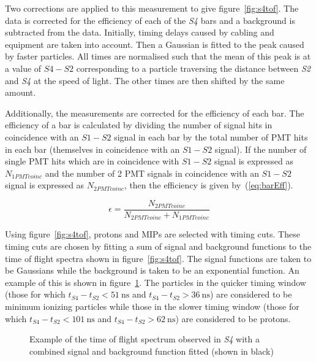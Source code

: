 Two corrections are applied to this measurement to give figure~\ref{fig:s4tof}. 
The data is corrected for the efficiency of each of the \textit{S4} bars and a background is subtracted from the data. %
Initially, timing delays caused by cabling and equipment are taken into account. %
Then a Gaussian is fitted to the peak caused by faster particles.
All times are normalised such that the mean of this peak is at a value of $\mathit{S4} - \mathit{S2}$ corresponding to a particle traversing the distance between \textit{S2} and \textit{S4} at the speed of light. 
The other times are then shifted by the same amount.

Additionally, the measurements are corrected for the efficiency of each bar. 
The efficiency of a bar is calculated by dividing the number of signal hits in coincidence with an $\mathit{S1}-\mathit{S2}$ signal in each bar by the total number of PMT hits in each bar (themselves in coincidence with an $\mathit{S1}-\mathit{S2}$ signal). 
If the number of single PMT hits which are in coincidence with $\mathit{S1}-\mathit{S2}$ signal is expressed as $N_{1PMTcoinc}$ and the number of 2 PMT signals in coincidence with an $\mathit{S1}-\mathit{S2}$ signal is expressed as $N_{2PMTcoinc}$, then the efficiency is given by~(\ref{eq:barEff}).

\begin{equation}
  \epsilon = \frac{N_{2PMTcoinc}}{N_{2PMTcoinc}+N_{1PMTcoinc}}
  \label{eq:barEff}
\end{equation}

Using figure~\ref{fig:s4tof}, protons and MIPs are selected with timing cuts. 
These timing cuts are chosen by fitting a sum of signal and background functions to the time of flight spectra shown in figure~\ref{fig:s4tof}. 
The signal functions are taken to be Gaussians while the background is taken to be an exponential function. 
An example of this is shown in figure~\ref{fig:fitEx}.
The particles in the quicker timing window (those for which $t_{\mathit{S4}}-t_{\mathit{S2}}<51~\text{ns}$ and $t_{\mathit{S4}}-t_{\mathit{S2}}>36~\text{ns}$) are considered to be minimum ionizing particles while those in the slower timing window (those for which $t_{\mathit{S4}}-t_{\mathit{S2}}<101~\text{ns}$ and $t_{\mathit{S4}}-t_{\mathit{S2}}>62~\text{ns}$) are considered to be protons.

\begin{figure}[h]
  \begin{adjustbox}{max totalsize={.7\textwidth}{.62\textheight},center}
    
  \end{adjustbox}
  \caption{Example of the time of flight spectrum observed in \textit{S4} with a combined signal and background function fitted (shown in black)}
  \label{fig:fitEx}
\end{figure}

